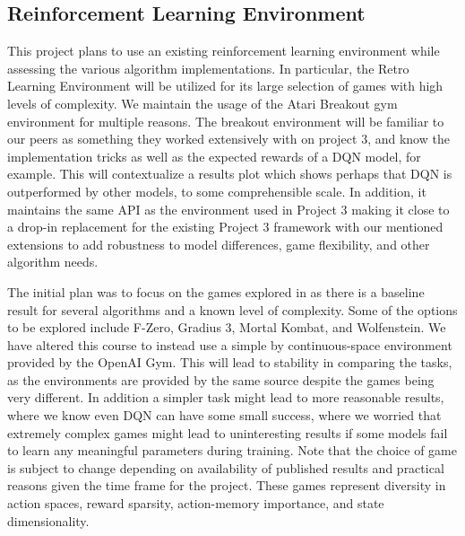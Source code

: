 \documentclass[conference]{IEEEtran}
\begin{document}
\subsection{Reinforcement Learning Environment}
This project plans to use an existing reinforcement learning environment while assessing the various algorithm implementations.
In particular, the Retro Learning Environment \cite{nichol2018retro} will be utilized for its large selection of games with high levels of complexity.
We maintain the usage of the Atari Breakout gym environment for multiple reasons. The breakout environment will be familiar to our peers as something they worked extensively with on project 3, and know the implementation tricks as well as the expected rewards of a DQN model, for example. This will contextualize a results plot which shows perhaps that DQN is outperformed by other models, to some comprehensible scale.
In addition, it maintains the same API as the environment used in Project 3 making it close to a drop-in replacement for the existing Project 3 framework with our mentioned extensions to add robustness to model differences, game flexibility, and other algorithm needs.

The initial plan was to focus on the games explored in \cite{bhonker2017playing} as there is a baseline result for several algorithms and a known level of complexity.
Some of the options to be explored include F-Zero, Gradius 3, Mortal Kombat, and Wolfenstein.
We have altered this course to instead use a simple by continuous-space environment provided by the OpenAI Gym. This will lead to stability in comparing the tasks, as the environments are provided by the same source despite the games being very different. In addition a simpler task might lead to more reasonable results, where we know even DQN can have some small success, where we worried that extremely complex games might lead to uninteresting results if some models fail to learn any meaningful parameters during training.
Note that the choice of game is subject to change depending on availability of published results and practical reasons given the time frame for the project.
These games represent diversity in action spaces, reward sparsity, action-memory importance, and state dimensionality.
\end{document}
